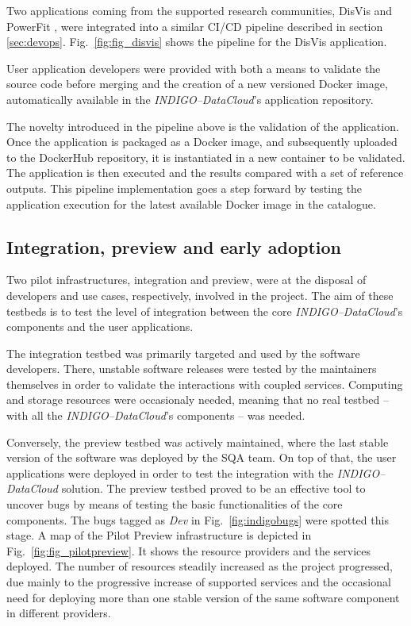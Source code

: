 Two applications coming from the supported research communities,
DisVis \cite{disvis} and PowerFit \cite{powerfit}, were
integrated into a similar CI/CD pipeline described in section \ref{sec:devops}.
Fig.~\ref{fig:fig_disvis} shows the pipeline for the DisVis application.

User application developers were provided with both a means to validate the
source code before merging and the creation of a new versioned Docker image,
automatically available in the {\sl INDIGO--DataCloud}'s application repository.

The novelty introduced in the pipeline above is the validation of the application.
Once the application is packaged as a Docker image, and subsequently uploaded
to the DockerHub repository, it is instantiated in a new container to be validated.
The application is then executed and the results compared with a set of reference outputs.
This pipeline implementation goes a step forward by testing the application
execution for the latest available Docker image in the catalogue.

\subsection{Integration, preview and early adoption}

Two pilot infrastructures, integration and preview, were at the disposal of developers and use cases, 
respectively, involved in the project. The aim of these testbeds is to test the level of integration 
between the core {\sl INDIGO--DataCloud}'s components and the user applications.

The integration testbed was primarily targeted and used by the software developers. 
There, unstable
software releases were tested by the maintainers themselves in order to validate the interactions
with coupled services. Computing and storage resources were occasionaly needed, meaning that no real
testbed -- with all
the {\sl INDIGO--DataCloud}'s components -- was needed. 

Conversely, the preview testbed was actively maintained, where the last stable version of
the software was deployed by the SQA team. On top of that, the user applications were 
deployed in order to test the integration with the {\sl INDIGO--DataCloud} solution. The
preview testbed proved to be an effective tool to uncover bugs by means of testing the 
basic functionalities of the core components. The bugs tagged as \emph{Dev} in
Fig.~\ref{fig:indigobugs} were spotted this stage. A map of the Pilot Preview
infrastructure is depicted in Fig.~\ref{fig:fig_pilotpreview}. It shows the
resource providers and the services deployed. The number of resources
steadily increased as the project progressed, due mainly to the progressive increase of 
supported services and the occasional need for deploying more than one stable version of
the same software component in different providers. 


